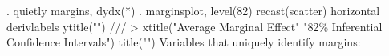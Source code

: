 . quietly  margins, dydx(*) 
{\smallskip}
. marginsplot, level(82) recast(scatter) horizontal derivlabels ytitle("") ///
>   xtitle("Average Marginal Effect" "82\% Inferential Confidence Intervals") title("")
{\smallskip}
Variables that uniquely identify margins: {}
